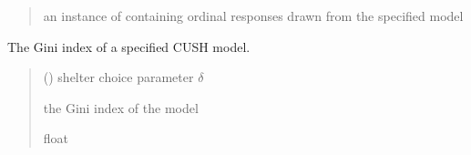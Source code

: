 \documentclass[letterpaper,10pt,english]{sphinxmanual}
\begin{document}
\begin{fulllineitems}
\begin{quote}
\begin{description}
\begin{itemize}
\end{itemize}

\sphinxAtStartPar
an instance of  containing ordinal responses drawn from the specified model

\end{description}\end{quote}

\end{fulllineitems}


\begin{fulllineitems}
\label{\detokenize{cubmods:cubmods.cush.gini}}
\pysigstartsignatures
{}
\pysigstopsignatures
\sphinxAtStartPar
The Gini index of a specified CUSH model.
\begin{quote}\begin{description}
\sphinxAtStartPar
{} () \textendash{} shelter choice parameter \(\delta\)

\sphinxAtStartPar
the Gini index of the model

\sphinxAtStartPar
float

\end{description}\end{quote}

\end{fulllineitems}

\end{document}
